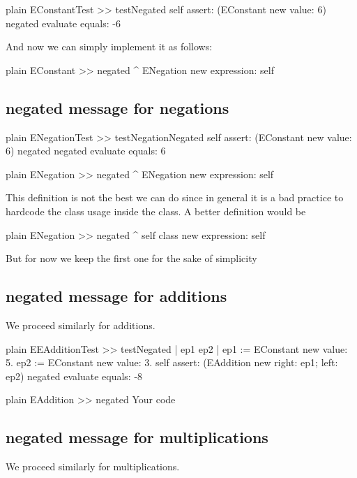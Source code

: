 \documentclass[10pt,twoside,english]{_support/latex/sbabook/sbabook}
\begin{document}
\begin{displaycode}{plain}
EConstantTest >> testNegated
	self assert: (EConstant new value: 6) negated evaluate equals: -6
\end{displaycode}

And now we can simply implement it as follows: 

\begin{displaycode}{plain}
EConstant >> negated
	^ ENegation new expression: self
\end{displaycode}
\subsection{negated message for negations}
\begin{displaycode}{plain}
ENegationTest >> testNegationNegated
	self assert: (EConstant new value: 6) negated negated evaluate equals: 6
\end{displaycode}

\begin{displaycode}{plain}
ENegation >> negated
	^ ENegation new expression: self
\end{displaycode}

This definition is not the best we can do since in general it is a bad practice to hardcode the class usage inside the class. A better definition would be 

\begin{displaycode}{plain}
ENegation >> negated
	^ self class new expression: self
\end{displaycode}

But for now we keep the first one for the sake of simplicity
\subsection{negated message for additions}
We proceed similarly for additions. 

\begin{displaycode}{plain}
EEAdditionTest >> testNegated
	| ep1 ep2 |
	ep1 := EConstant new value: 5.
	ep2 := EConstant new value: 3.
	self assert: (EAddition new right: ep1; left: ep2) negated evaluate equals: -8
\end{displaycode}

\begin{displaycode}{plain}
EAddition >> negated
	Your code
\end{displaycode}
\subsection{negated message for multiplications}
We proceed similarly for multiplications. 
\end{document}
